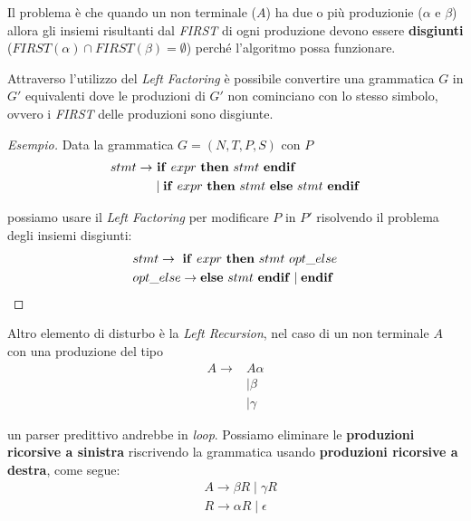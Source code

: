 Il problema è che quando un non terminale ($A$) ha due o più produzionie
($\alpha$ e $\beta$) allora gli insiemi risultanti dal \textit{FIRST} di ogni
produzione devono essere \textbf{disgiunti}
($FIRST(\alpha) \cap FIRST(\beta) = \emptyset$) perché l'algoritmo possa
funzionare.

Attraverso l'utilizzo del \textit{Left Factoring} è possibile convertire una
grammatica $G$ in $G'$ equivalenti dove le produzioni di $G'$ non cominciano con
lo stesso simbolo, ovvero i \textit{FIRST} delle produzioni sono disgiunte.

\begin{proof}[Esempio]
Data la grammatica $G = (N,T,P,S)$ con $P$
\begin{align*}
  stmt \to
  & \ \text{\textbf{if}} \ expr \ \text{\textbf{then}} \
    stmt \ \text{\textbf{endif}} \\
  & \mid \text{\textbf{if}} \ expr \ \text{\textbf{then}} \ stmt \
    \text{\textbf{else}} \ stmt \ \text{\textbf{endif}}
\end{align*}

possiamo usare il \textit{Left Factoring} per modificare $P$ in $P'$ risolvendo
il problema degli insiemi disgiunti:
\begin{align*}
& stmt \to \ \text{\textbf{if}} \ expr \ \text{\textbf{then}} \ stmt \
             opt\_else \\
& opt\_else \to \text{\textbf{else}} \ stmt \ \text{\textbf{endif}}
                \mid \text{\textbf{endif}}
\end{align*}
\end{proof}

Altro elemento di disturbo è la \textit{Left Recursion}, nel caso di un non
terminale $A$ con una produzione del tipo
\begin{align*}
A \to & A \alpha \\
      & \mid \beta \\
      & \mid \gamma
\end{align*}

un parser predittivo andrebbe in \textit{loop}. Possiamo eliminare le
\textbf{produzioni ricorsive a sinistra} riscrivendo la grammatica usando
\textbf{produzioni ricorsive a destra}, come segue:
\begin{align*}
& A \to \beta R \mid \gamma R  \\
& R \to \alpha R \mid \epsilon
\end{align*}

